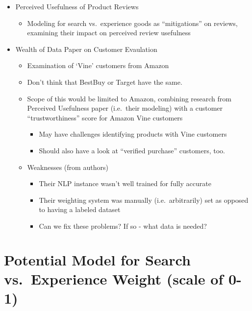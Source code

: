 \documentclass[
  letterpaper,
  DIV=11,
  numbers=noendperiod]{scrreprt}
\providecommand{\tightlist}{%
  \setlength{\itemsep}{0pt}\setlength{\parskip}{0pt}}\usepackage{longtable,booktabs,array}
\begin{document}
\begin{itemize}
\item
  Perceived Usefulness of Product Reviews

  \begin{itemize}
  \tightlist
  \item
    Modeling for search vs.~experience goods as ``mitigations'' on
    reviews, examining their impact on perceived review usefulness
  \end{itemize}
\item
  Wealth of Data Paper on Customer Evaulation

  \begin{itemize}
  \item
    Examination of `Vine' customers from Amazon
  \item
    Don't think that BestBuy or Target have the same.
  \item
    Scope of this would be limited to Amazon, combining research from
    Perceived Usefulness paper (i.e.~their modeling) with a customer
    ``trustworthiness'' score for Amazon Vine customers

    \begin{itemize}
    \item
      May have challenges identifying products with Vine customers
    \item
      Should also have a look at ``verified purchase'' customers, too.
    \end{itemize}
  \item
    Weaknesses (from authors)

    \begin{itemize}
    \item
      Their NLP instance wasn't well trained for fully accurate
    \item
      Their weighting system was manually (i.e.~arbitrarily) set as
      opposed to having a labeled dataset
    \item
      Can we fix these problems? If so - what data is needed?
    \end{itemize}
  \end{itemize}
\end{itemize}

\section{Potential Model for Search vs.~Experience Weight (scale of
0-1)}\label{potential-model-for-search-vs.-experience-weight-scale-of-0-1}
\end{document}
